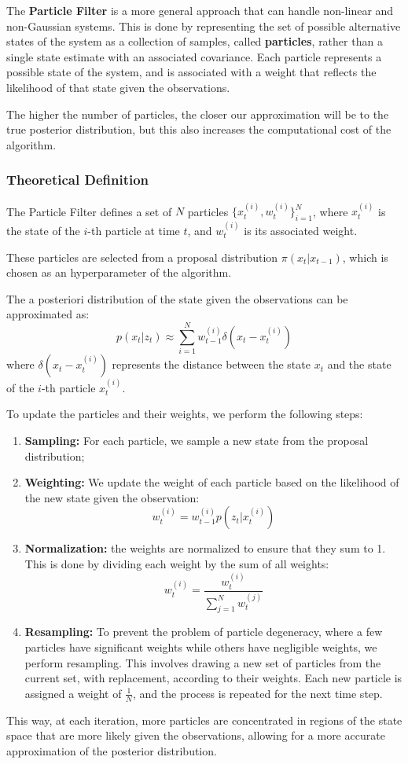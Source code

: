 The \textbf{Particle Filter} is a more general approach that can handle non-linear and non-Gaussian systems.
This is done by representing the set of possible alternative states of the system as a collection of samples, called \textbf{particles}, rather than a single state estimate with an associated covariance.
Each particle represents a possible state of the system, and is associated with a weight that reflects the
likelihood of that state given the observations.

The higher the number of particles, the closer our approximation will be to the true posterior distribution, but this also increases the computational cost of the algorithm.

\subsubsection{Theoretical Definition}
The Particle Filter defines a set of $N$ particles 
$\{x_t^{(i)}, w_t^{(i)}\}_{i=1}^N$, where $x_t^{(i)}$ is the state of the $i$-th particle at time $t$, 
and $w_t^{(i)}$ is its associated weight.

These particles are selected from a proposal distribution $\pi(x_t | x_{t-1})$, 
which is chosen as an hyperparameter of the algorithm.

The a posteriori distribution of the state given the observations can be approximated as:
\[ p(x_t | z_{t}) \approx \sum_{i=1}^N w_{t-1}^{(i)} \delta(x_t - x_t^{(i)}) \]
where $\delta(x_t - x_t^{(i)})$ represents the distance between the state $x_t$ and the state of the $i$-th particle $x_t^{(i)}$.

To update the particles and their weights, we perform the following steps:
\begin{enumerate}
    \item \textbf{Sampling:} For each particle, we sample a new state from the proposal distribution;
    \item \textbf{Weighting:} We update the weight of each particle based on the likelihood of the new state given the observation:
    \[ w_t^{(i)} = w_{t-1}^{(i)} p(z_t | x_t^{(i) }) \]
    \item \textbf{Normalization:} the weights are normalized to ensure that they sum to 1. This is done by dividing
    each weight by the sum of all weights:
    \[ w_t^{(i)} = \frac{w_t^{(i)}}{\sum_{j=1}^N w_t^{(j)}} \]
    \item \textbf{Resampling:} To prevent the problem of particle degeneracy, where a few particles have significant weights while others have negligible weights, we perform resampling.
    This involves drawing a new set of particles from the current set, with replacement, according to their weights.
    Each new particle is assigned a weight of $\frac{1}{N}$, and the process is repeated for the next time step.
\end{enumerate}
This way, at each iteration, more particles are concentrated in regions of the state space that are more likely given the observations, allowing for a more accurate approximation of the posterior distribution.

